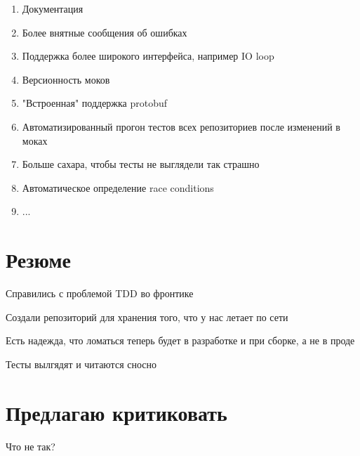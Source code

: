 \documentclass[12pt]{article}
\begin{document}
\begin{enumerate}
\Large \item Документация
\item \normalsize  Более внятные сообщения об ошибках
\item \small Поддержка более широкого интерфейса, например IO loop
\item \small Версионность моков
\item \footnotesize "Встроенная" поддержка protobuf
\item \tiny Автоматизированный прогон тестов всех репозиториев после изменений в моках
\item \scriptsize Больше сахара, чтобы тесты не выглядели так страшно
\item \scriptsize Автоматическое определение race conditions
\item \scriptsize ...

\end{enumerate}

\section{Резюме}

Справились с проблемой TDD во фронтике

Создали репозиторий для хранения того, что у нас летает по сети

Есть надежда, что ломаться теперь будет в разработке и при сборке, а не в проде

Тесты вылгядят и читаются сносно

\section{Предлагаю критиковать}
Что не так?
\end{document}
